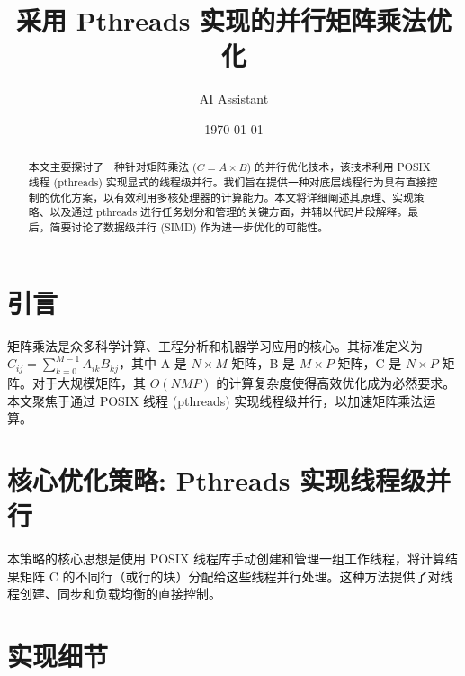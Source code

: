 \documentclass{article}
\title{采用 Pthreads 实现的并行矩阵乘法优化}
\author{AI Assistant}
\date{\today}
\begin{document}
\maketitle
\begin{abstract}
本文主要探讨了一种针对矩阵乘法 ($C = A \times B$) 的并行优化技术，该技术利用 POSIX 线程 (pthreads) 实现显式的线程级并行。我们旨在提供一种对底层线程行为具有直接控制的优化方案，以有效利用多核处理器的计算能力。本文将详细阐述其原理、实现策略、以及通过 pthreads 进行任务划分和管理的关键方面，并辅以代码片段解释。最后，简要讨论了数据级并行 (SIMD) 作为进一步优化的可能性。
\end{abstract}

\section{引言}
矩阵乘法是众多科学计算、工程分析和机器学习应用的核心。其标准定义为 $C_{ij} = \sum_{k=0}^{M-1} A_{ik} B_{kj}$，其中 A 是 $N \times M$ 矩阵，B 是 $M \times P$ 矩阵，C 是 $N \times P$ 矩阵。对于大规模矩阵，其 $O(NMP)$ 的计算复杂度使得高效优化成为必然要求。本文聚焦于通过 POSIX 线程 (pthreads) 实现线程级并行，以加速矩阵乘法运算。

\section{核心优化策略: Pthreads 实现线程级并行}
本策略的核心思想是使用 POSIX 线程库手动创建和管理一组工作线程，将计算结果矩阵 C 的不同行（或行的块）分配给这些线程并行处理。这种方法提供了对线程创建、同步和负载均衡的直接控制。

\section{实现细节}
\end{document}
